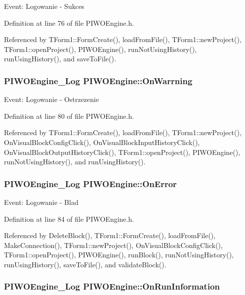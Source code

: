 Event: Logowanie - Sukces 

Definition at line 76 of file PIWOEngine.h.

Referenced by TForm1::FormCreate(), loadFromFile(), TForm1::newProject(), TForm1::openProject(), PIWOEngine(), runNotUsingHistory(), runUsingHistory(), and saveToFile().\hypertarget{classPIWOEngine_c7a83bdff3736e35b68584bcb3a4b699}{
\subsubsection[OnWarrning]{\setlength{\rightskip}{0pt plus 5cm}PIWOEngine\_\-Log {\bf PIWOEngine::OnWarrning}}}
\label{classPIWOEngine_c7a83bdff3736e35b68584bcb3a4b699}


Event: Logowanie - Ostrzezenie 

Definition at line 80 of file PIWOEngine.h.

Referenced by TForm1::FormCreate(), loadFromFile(), TForm1::newProject(), OnVisualBlockConfigClick(), OnVisualBlockInputHistoryClick(), OnVisualBlockOutputHistoryClick(), TForm1::openProject(), PIWOEngine(), runNotUsingHistory(), and runUsingHistory().\hypertarget{classPIWOEngine_55424b81f56591f23f3b58e0fdd399d2}{
\subsubsection[OnError]{\setlength{\rightskip}{0pt plus 5cm}PIWOEngine\_\-Log {\bf PIWOEngine::OnError}}}
\label{classPIWOEngine_55424b81f56591f23f3b58e0fdd399d2}


Event: Logowanie - Blad 

Definition at line 84 of file PIWOEngine.h.

Referenced by DeleteBlock(), TForm1::FormCreate(), loadFromFile(), MakeConnection(), TForm1::newProject(), OnVisualBlockConfigClick(), TForm1::openProject(), PIWOEngine(), runBlock(), runNotUsingHistory(), runUsingHistory(), saveToFile(), and validateBlock().\hypertarget{classPIWOEngine_02e912fd9ead4eabd48b32f769bd77c1}{
\subsubsection[OnRunInformation]{\setlength{\rightskip}{0pt plus 5cm}PIWOEngine\_\-Log {\bf PIWOEngine::OnRunInformation}}}
\label{classPIWOEngine_02e912fd9ead4eabd48b32f769bd77c1}


